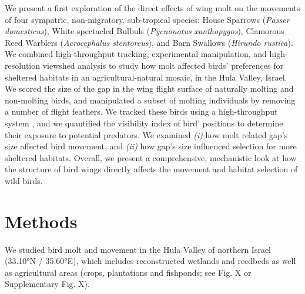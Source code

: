 We present a first exploration of the direct effects of wing molt on the movements of four sympatric, non-migratory, sub-tropical species: House Sparrows (\textit{Passer domesticus}), White-spectacled Bulbuls (\textit{Pycnonotus xanthopygos}), Clamorous Reed Warblers (\textit{Acrocephalus stentoreus}), and Barn Swallows (\textit{Hirundo rustica}).
We combined high-throughput tracking, experimental manipulation, and high-resolution viewshed analysis to study how molt affected birds' preferences for sheltered habitats in an agricultural-natural mosaic, in the Hula Valley, Israel.
We scored the size of the gap in the wing flight surface \citep{lind2001,kiat2016} of naturally molting and non-molting birds, and manipulated a subset of molting individuals by removing a number of flight feathers.
We tracked these birds using a high-throughput system \citep{toledo2014,weiser2016,toledo2020}, and we quantified the visibility index of bird' positions to determine their exposure to potential predators.
We examined \textit{(i)} how molt related gap's size affected bird movement, and \textit{(ii)} how gap's size influenced selection for more sheltered habitats.
Overall, we present a comprehensive, mechanistic look at how the structure of bird wings directly affects the movement and habitat selection of wild birds.

\section*{Methods}

We studied bird molt and movement in the Hula Valley of northern Israel (33.10°N / 35.60°E), which includes reconstructed wetlands and reedbeds as well as agricultural areas (crops, plantations and fishponds; see Fig. X or Supplementary Fig. X).

